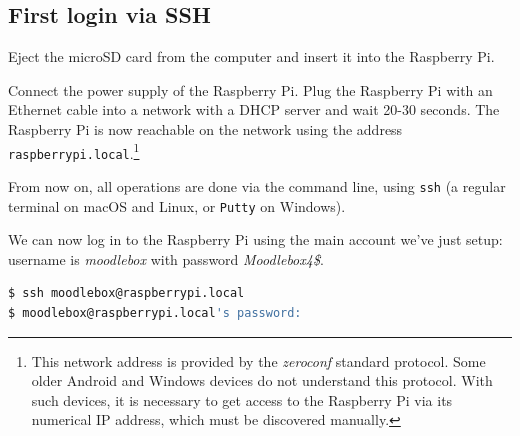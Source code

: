 \documentclass[12pt]{article}
\begin{document}
\subsection{First login via SSH}

Eject the microSD card from the computer and insert it into the Raspberry Pi.

Connect the power supply of the Raspberry Pi.
Plug the Raspberry Pi with an Ethernet cable into a network with a DHCP server and wait 20-30 seconds.
The Raspberry Pi is now reachable on the network using the address \lstinline{raspberrypi.local}.\footnote{This network address is provided by the \emph{zeroconf} standard protocol.
Some older Android and Windows devices do not understand this protocol.
With such devices, it is necessary to get access to the Raspberry Pi via its numerical IP address, which must be discovered manually.}

From now on, all operations are done via the command line, using \lstinline{ssh} (a regular terminal on macOS and Linux, or \lstinline{Putty} on Windows).

We can now log in to the Raspberry Pi using the main account we've just setup: username is \emph{moodlebox} with password \emph{Moodlebox4\$}.

\begin{lstlisting}[language=bash]
$ ssh moodlebox@raspberrypi.local
$ moodlebox@raspberrypi.local's password:
\end{lstlisting}
\end{document}
